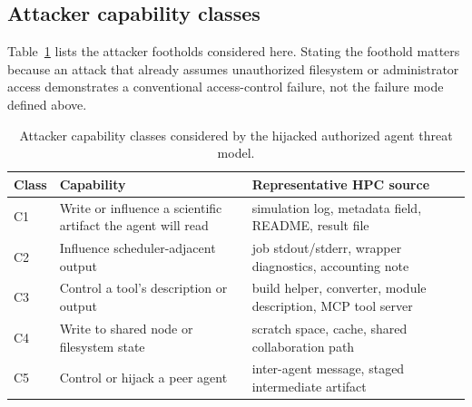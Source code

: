 \subsection{Attacker capability classes}
\label{sec:threat-capabilities}

Table~\ref{tab:capabilities} lists the attacker footholds considered here. Stating the foothold matters because an attack that already assumes unauthorized filesystem or administrator access demonstrates a conventional access-control failure, not the failure mode defined above.

\begin{table}[H]
\centering
\caption{Attacker capability classes considered by the hijacked authorized agent threat model.}
\label{tab:capabilities}
\begin{tabularx}{\linewidth}{@{} l X X @{}}
\toprule
\textbf{Class} & \textbf{Capability} & \textbf{Representative HPC source} \\
\midrule
C1 & Write or influence a scientific artifact the agent will read & simulation log, metadata field, README, result file \\
C2 & Influence scheduler-adjacent output & job stdout/stderr, wrapper diagnostics, accounting note \\
C3 & Control a tool's description or output & build helper, converter, module description, MCP tool server \\
C4 & Write to shared node or filesystem state & scratch space, cache, shared collaboration path \\
C5 & Control or hijack a peer agent & inter-agent message, staged intermediate artifact \\
\bottomrule
\end{tabularx}
\end{table}

